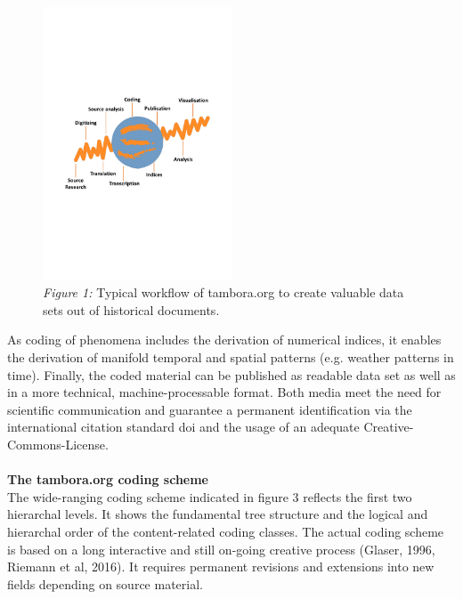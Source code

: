 \begin{figure}[H]
	\begin{center}
 \includegraphics[width=0.5\textwidth]{fig/notes/workflow.pdf}
 \caption*{\textit{Figure 1:} Typical workflow of tambora.org to create valuable data sets out of historical documents.}
 \end{center}
\end{figure}
As coding of phenomena includes the derivation of numerical indices, it enables the derivation of manifold temporal and spatial patterns (e.g. weather patterns in time). Finally, the coded material can be published as readable data set as well as in a more technical, machine-processable format. Both media meet the need for scientific communication and guarantee a permanent identification via the international citation standard doi and the usage of an adequate Creative-Commons-License.
\\\\
\textbf{The tambora.org coding scheme}
\vspace{0.25cm}\\
The wide-ranging coding scheme indicated in figure 3 reflects the first two hierarchal levels. It shows the fundamental tree structure and the logical and hierarchal order of the content-related coding classes. The actual coding scheme is based on a long interactive and still on-going creative process (Glaser, 1996, Riemann et al, 2016). It requires permanent revisions and extensions into new fields depending on source material.
